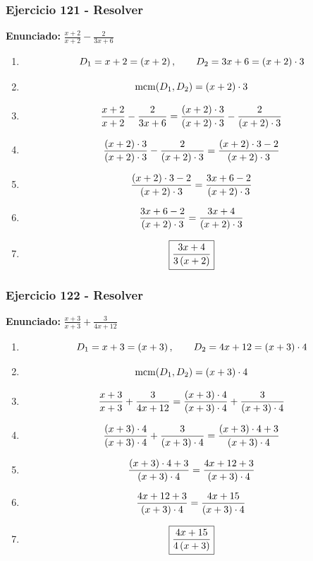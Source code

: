 \documentclass[11pt,a4paper]{article}
\newcommand{\fitmath}[1]{%
\[
\setbox0=\hbox{$\displaystyle #1$}%
\ifdim\wd0>\linewidth
\resizebox{\linewidth}{!}{$\displaystyle #1$}%
\else
#1%
\fi
\]
}
\begin{document}
\subsubsection*{Ejercicio 121 - Resolver}
\textbf{Enunciado:} $ \frac{x + 2}{x + 2} - \frac{2}{3 x + 6} $\par
\begin{enumerate}[leftmargin=2em]
\item \fitmath{D_1=x + 2=\left(x + 2\right),\qquad D_2=3 x + 6=\left(x + 2\right)\cdot 3}
\item \fitmath{\operatorname{mcm}(D_1,D_2)=\left(x + 2\right)\cdot 3}
\item \fitmath{\frac{x + 2}{x + 2} - \frac{2}{3 x + 6}= \frac{\left(x + 2\right)\cdot 3}{\left(x + 2\right)\cdot 3} - \frac{2}{\left(x + 2\right)\cdot 3}}
\item \fitmath{\frac{\left(x + 2\right)\cdot 3}{\left(x + 2\right)\cdot 3} - \frac{2}{\left(x + 2\right)\cdot 3}=\frac{\left(x + 2\right)\cdot 3 - 2}{\left(x + 2\right)\cdot 3}}
\item \fitmath{\frac{\left(x + 2\right)\cdot 3 - 2}{\left(x + 2\right)\cdot 3}=\frac{3 x + 6 - 2}{\left(x + 2\right)\cdot 3}}
\item \fitmath{\frac{3 x + 6 - 2}{\left(x + 2\right)\cdot 3}=\frac{3 x + 4}{\left(x + 2\right)\cdot 3}}
\item \fitmath{\boxed{\frac{3 x + 4}{3 \left(x + 2\right)}}}
\end{enumerate}

\vspace{0.12cm}
\subsubsection*{Ejercicio 122 - Resolver}
\textbf{Enunciado:} $ \frac{x + 3}{x + 3} + \frac{3}{4 x + 12} $\par
\begin{enumerate}[leftmargin=2em]
\item \fitmath{D_1=x + 3=\left(x + 3\right),\qquad D_2=4 x + 12=\left(x + 3\right)\cdot 4}
\item \fitmath{\operatorname{mcm}(D_1,D_2)=\left(x + 3\right)\cdot 4}
\item \fitmath{\frac{x + 3}{x + 3} + \frac{3}{4 x + 12}= \frac{\left(x + 3\right)\cdot 4}{\left(x + 3\right)\cdot 4} + \frac{3}{\left(x + 3\right)\cdot 4}}
\item \fitmath{\frac{\left(x + 3\right)\cdot 4}{\left(x + 3\right)\cdot 4} + \frac{3}{\left(x + 3\right)\cdot 4}=\frac{\left(x + 3\right)\cdot 4 + 3}{\left(x + 3\right)\cdot 4}}
\item \fitmath{\frac{\left(x + 3\right)\cdot 4 + 3}{\left(x + 3\right)\cdot 4}=\frac{4 x + 12 + 3}{\left(x + 3\right)\cdot 4}}
\item \fitmath{\frac{4 x + 12 + 3}{\left(x + 3\right)\cdot 4}=\frac{4 x + 15}{\left(x + 3\right)\cdot 4}}
\item \fitmath{\boxed{\frac{4 x + 15}{4 \left(x + 3\right)}}}
\end{enumerate}
\end{document}

